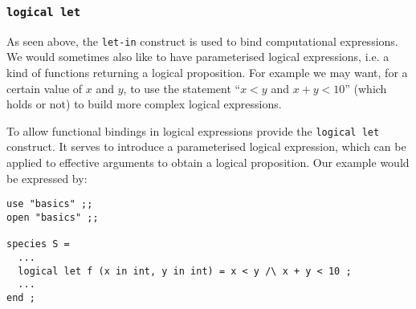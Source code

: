 \subsubsection{{\tt logical let}}
As seen above, the {\tt let-in} construct is used to bind
computational expressions. We would sometimes also like to have
parameterised logical expressions, i.e. a kind of functions returning
a logical proposition. For example we may want,  for a certain value
of $x$ and $y$, to use the statement ``$x<y$ and $x+y < 10$'' (which
holds or not) to build more complex logical expressions.






To allow functional bindings in logical expressions {\focal} provide
the {\tt logical let} construct. It serves to introduce a
parameterised logical expression,  which can be applied to effective
arguments to obtain a logical proposition.  Our example would be
expressed by:
{\scriptsize
\begin{lstlisting}
use "basics" ;;
open "basics" ;;

species S =
  ...
  logical let f (x in int, y in int) = x < y /\ x + y < 10 ;
  ...
end ;
\end{lstlisting}
}


